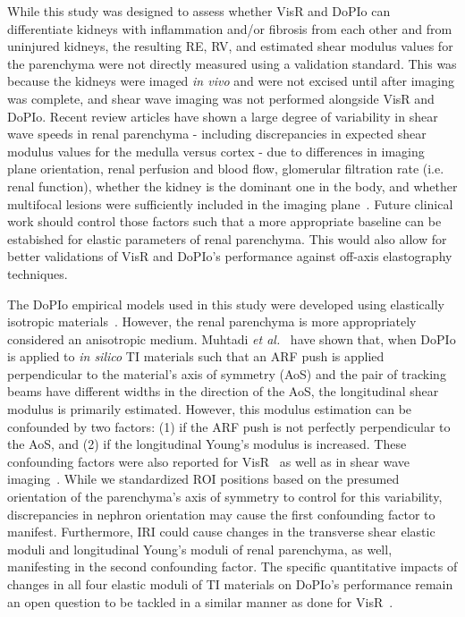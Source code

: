 While this study was designed to assess whether VisR and DoPIo can differentiate kidneys with inflammation and/or fibrosis from each other and from uninjured kidneys, the resulting RE, RV, and estimated shear modulus values for the parenchyma were not directly measured using a validation standard. This was because the kidneys were imaged \emph{in vivo} and were not excised until after imaging was complete, and shear wave imaging was not performed alongside VisR and DoPIo. Recent review articles have shown a large degree of variability in shear wave speeds in renal parenchyma - including discrepancies in expected shear modulus values for the medulla versus cortex - due to differences in imaging plane orientation, renal perfusion and blood flow, glomerular filtration rate (i.e. renal function), whether the kidney is the dominant one in the body, and whether multifocal lesions were sufficiently included in the imaging plane~\cite{urban_Novel_2021,lim_Shear_2021,ce_Ultrasound_2023,leong_Stiffness_2020}. Future clinical work should control those factors such that a more appropriate baseline can be estabished for elastic parameters of renal parenchyma. This would also allow for better validations of VisR and DoPIo's performance against off-axis elastography techniques.

The DoPIo empirical models used in this study were developed using elastically isotropic materials~\cite{yokoyama_DoubleProfile_2025}. However, the renal parenchyma is more appropriately considered an anisotropic medium. Muhtadi \emph{et al.}~\cite{muhtadi_Double_2025} have shown that, when DoPIo is applied to \emph{in silico} TI materials such that an ARF push is applied perpendicular to the material's axis of symmetry (AoS) and the pair of tracking beams have different widths in the direction of the AoS, the longitudinal shear modulus is primarily estimated. However, this modulus estimation can be confounded by two factors: (1) if the ARF push is not perfectly perpendicular to the AoS, and (2) if the longitudinal Young's modulus is increased. These confounding factors were also reported for VisR~\cite{muhtadi_VisR_2024} as well as in shear wave imaging~\cite{andrade_Simultaneous_2025,ngo_plane_2024}. While we standardized ROI positions based on the presumed orientation of the parenchyma's axis of symmetry to control for this variability, discrepancies in nephron orientation may cause the first confounding factor to manifest. Furthermore, IRI could cause changes in the transverse shear elastic moduli and longitudinal Young's moduli of renal parenchyma, as well, manifesting in the second confounding factor. The specific quantitative impacts of changes in all four elastic moduli of TI materials on DoPIo's performance remain an open question to be tackled in a similar manner as done for VisR~\cite{muhtadi_VisR_2024}.

